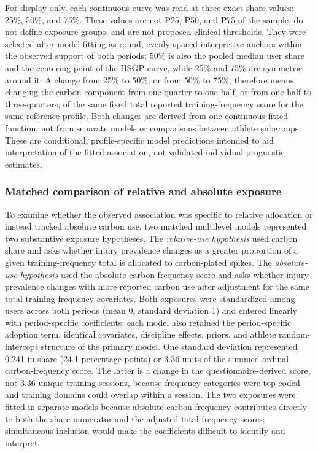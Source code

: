 For display only, each continuous curve was read at three exact share values: 25\%, 50\%, and 75\%. These values are not P25, P50, and P75 of the sample, do not define exposure groups, and are not proposed clinical thresholds. They were selected after model fitting as round, evenly spaced interpretive anchors within the observed support of both periods; 50\% is also the pooled median user share and the centering point of the HSGP curve, while 25\% and 75\% are symmetric around it. A change from 25\% to 50\%, or from 50\% to 75\%, therefore means changing the carbon component from one-quarter to one-half, or from one-half to three-quarters, of the same fixed total reported training-frequency score for the same reference profile. Both changes are derived from one continuous fitted function, not from separate models or comparisons between athlete subgroups. These are conditional, profile-specific model predictions intended to aid interpretation of the fitted association, not validated individual prognostic estimates.

\subsubsection{Matched comparison of relative and absolute exposure}
\label{sec:exposure-scale-comparison}
To examine whether the observed association was specific to relative allocation or instead tracked absolute carbon use, two matched multilevel models represented two substantive exposure hypotheses. The \emph{relative-use hypothesis} used carbon share and asks whether injury prevalence changes as a greater proportion of a given training-frequency total is allocated to carbon-plated spikes. The \emph{absolute-use hypothesis} used the absolute carbon-frequency score and asks whether injury prevalence changes with more reported carbon use after adjustment for the same total training-frequency covariates. Both exposures were standardized among users across both periods (mean 0, standard deviation 1) and entered linearly with period-specific coefficients; each model also retained the period-specific adoption term, identical covariates, discipline effects, priors, and athlete random-intercept structure of the primary model. One standard deviation represented 0.241 in share (24.1 percentage points) or 3.36 units of the summed ordinal carbon-frequency score. The latter is a change in the questionnaire-derived score, not 3.36 unique training sessions, because frequency categories were top-coded and training domains could overlap within a session. The two exposures were fitted in separate models because absolute carbon frequency contributes directly to both the share numerator and the adjusted total-frequency scores; simultaneous inclusion would make the coefficients difficult to identify and interpret.

